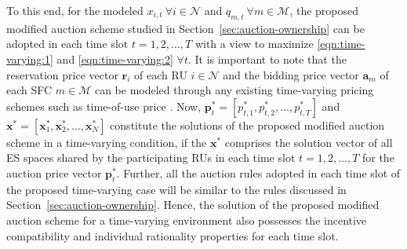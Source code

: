 \documentclass[journal,10pt]{IEEEtran}
\begin{document}
To this end, for the modeled $x_{i,t}~\forall i\in\mathcal{N}$ and $q_{m,t}~\forall m\in\mathcal{M}$, the proposed modified auction scheme studied in Section~\ref{sec:auction-ownership} can be adopted in each time slot $t=1, 2, \hdots, T$ with a view to maximize \eqref{eqn:time-varying:1} and \eqref{eqn:time-varying:2} $\forall t$. It is important to note that the reservation price vector $\mathbf{r}_i$ of each RU $i\in\mathcal{N}$  and the bidding price vector $\mathbf{a}_m$ of each SFC $m\in\mathcal{M}$ can be modeled through any existing time-varying pricing schemes such as time-of-use price \cite{Fang-J-CST:2012}. Now, $\mathbf{p}_{t}^* =  [p_{t,1}^*, p_{t,2}^*,\hdots, p_{t,T}^*]$ and $\mathbf{x}^* = [\mathbf{x}_1^*, \mathbf{x}_2^*, \hdots, \mathbf{x}_N^*]$ constitute the solutions of the proposed modified auction scheme in a time-varying condition, if the $\mathbf{x}^*$ comprises the solution vector of all ES spaces shared by the participating RUs in each time slot $t = 1, 2, \hdots, T$ for the auction price vector $\mathbf{p}_t^*$. Further, all the auction rules adopted in each time slot of the proposed time-varying case will be similar to the rules discussed in Section~\ref{sec:auction-ownership}. Hence, the solution of the proposed modified auction scheme for a time-varying environment also possesses the incentive compatibility and individual rationality properties for each time slot.
\end{document}
